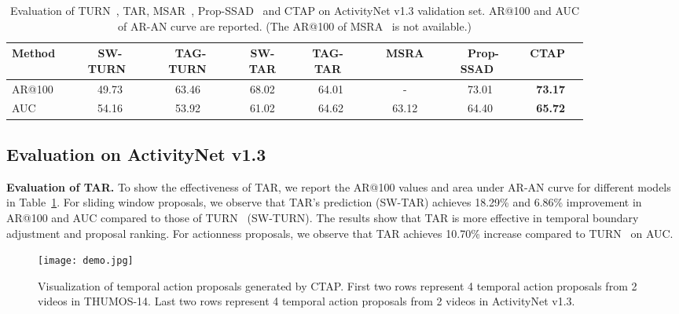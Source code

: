 \documentclass[runningheads]{llncs}
\begin{document}
\begin{table}[b]
  \centering
\caption{Evaluation of TURN~\cite{Gao_2017_ICCV}, TAR, MSAR~\cite{yao2017msr}, Prop-SSAD~\cite{lin2017temporal} and CTAP on ActivityNet v1.3 validation set. AR@100 and AUC of AR-AN curve are reported. (The AR@100 of MSRA~\cite{yao2017msr} is not available.)}\label{tbl: anet tar eval}
  \begin{tabular}{l|cc|cc|cc|c} \toprule
  Method\ & \makecell{SW-\\\ \ TURN~\cite{Gao_2017_ICCV}\ \ } & \makecell{TAG-\\\ \ TURN~\cite{Zhao_2017_ICCV}\ \ } & \makecell{SW-\\\ \ TAR\ \ } & \makecell{\ \ TAG-\ \ \ \\\ \ TAR\ \ \ } & \makecell{\ \ MSRA\ \ \\\cite{yao2017msr}} & \makecell{\ Prop-\\\ \ SSAD~\cite{lin2017temporal}\ \ } &\ CTAP\ \ \\ \midrule
  AR@100\ \ &\ 49.73\ &\ 63.46\ \ &\ 68.02\ &\ 64.01\ &\ -\ &\ 73.01\ &\ \textbf{73.17}\ \\
  AUC\ &\ 54.16\ &\ 53.92\ \ &\ 61.02\ &\ 64.62\ &\ 63.12\ &\ 64.40\ &\ \textbf{65.72}\ \\
\bottomrule
  \end{tabular}
\end{table}

\subsection{Evaluation on ActivityNet v1.3}





\textbf{Evaluation of TAR.} To show the effectiveness of TAR, we report the AR@100 values and area under AR-AN curve for different models in Table~\ref{tbl: anet tar eval}. 
For sliding window proposals, we observe that TAR's prediction (SW-TAR) achieves 18.29\% and 6.86\% improvement in AR@100 and AUC compared to those of TURN~\cite{Gao_2017_ICCV} (SW-TURN). The results show that TAR is more effective in temporal boundary adjustment and proposal ranking. For actionness proposals, we observe that TAR achieves 10.70\% increase compared to TURN~\cite{Gao_2017_ICCV} on AUC.

\begin{figure}[t]
  \centering
    \texttt{[image: demo.jpg]}
    \caption{Visualization of temporal action proposals generated by CTAP. First two rows represent 4 temporal action proposals from 2 videos in THUMOS-14. Last two rows represent 4 temporal action proposals from 2 videos in ActivityNet v1.3.}
      \label{fig: demo}
\end{figure}
\end{document}
